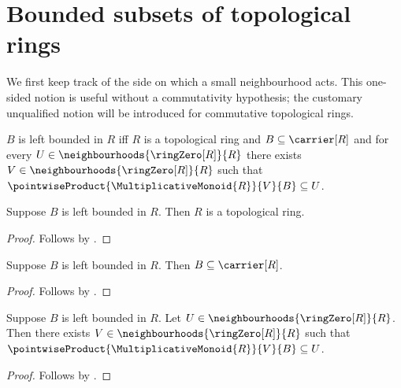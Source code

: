 



\section{Bounded subsets of topological rings}

We first keep track of the side on which a small neighbourhood acts.  This
one-sided notion is useful without a commutativity hypothesis; the customary
unqualified notion will be introduced for commutative topological rings.

\begin{definition}\label{left_bounded_in}
    $B$ is left bounded in $R$ iff
        $R$ is a topological ring and $B\subseteq\carrier[R]$ and
        for every $U\in\neighbourhoods{\ringZero[R]}{R}$ there exists
            $V\in\neighbourhoods{\ringZero[R]}{R}$ such that
            $\pointwiseProduct{\MultiplicativeMonoid{R}}{V}{B}\subseteq U$.
\end{definition}

\begin{proposition}\label{left_bounded_in_ambient}
    Suppose $B$ is left bounded in $R$.
    Then $R$ is a topological ring.
\end{proposition}
\begin{proof}
    Follows by .
\end{proof}

\begin{proposition}\label{left_bounded_in_carrier}
    Suppose $B$ is left bounded in $R$.
    Then $B\subseteq\carrier[R]$.
\end{proposition}
\begin{proof}
    Follows by .
\end{proof}

\begin{proposition}\label{left_bounded_in_neighbourhood}
    Suppose $B$ is left bounded in $R$.
    Let $U\in\neighbourhoods{\ringZero[R]}{R}$.
    Then there exists $V\in\neighbourhoods{\ringZero[R]}{R}$ such that
        $\pointwiseProduct{\MultiplicativeMonoid{R}}{V}{B}\subseteq U$.
\end{proposition}
\begin{proof}
    Follows by .
\end{proof}

